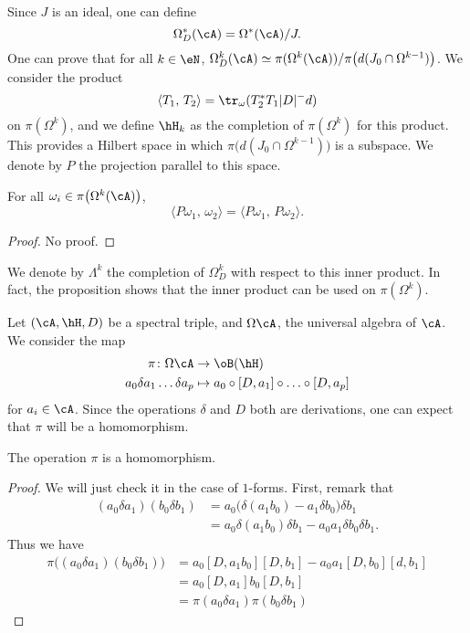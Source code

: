 Since $J$ is an ideal, one can define
\[
	\Omega^*_D(\cA)=\Omega^*(\cA)/J.
\]
One can prove that for all $k\in\eN$, $\Omega^k_D(\cA)\simeq \pi(\Omega^k(\cA))/\pi\big( d(J_0\cap\Omega^{k-1}) \big)$. We consider the product
\begin{equation}
	\langle T_1,\,T_2\rangle=\tr_{\omega}(T_2^*T_1| D |^-d)
\end{equation}
on $\pi(\Omega^k)$, and we define $\hH_k$ as the completion of $\pi(\Omega^k)$ for this product. This provides a Hilbert space in which $\pi\big( d(J_0\cap\Omega^{k-1}) \big)$ is a subspace. We denote by $P$ the projection parallel to this space.

\begin{proposition}
	For all $\omega_i\in\pi\big( \Omega^k(\cA) \big)$,
	\[
		\langle P\omega_1,\,\omega_2\rangle=\langle P\omega_1,\,P\omega_2\rangle.
	\]

\end{proposition}
\begin{proof}
	No proof.
\end{proof}
We denote by $\Lambda^k$ the completion of $\Omega^k_D$ with respect to this inner product. In fact, the proposition shows that the inner product can be used on $\pi(\Omega^k)$.



Let $(\cA,\hH,D)$ be a spectral triple, and $\Omega\cA$, the universal algebra of $\cA$. We consider the map
\begin{equation}	\label{EqDEfpirep}
	\begin{aligned}
		\pi\colon\Omega\cA            & \to \oB(\hH)                                    \\
		a_0\delta a_1\ldots\delta a_p & \mapsto a_0\circ[D,a_1]\circ\ldots\circ [D,a_p]
	\end{aligned}
\end{equation}
for $a_i\in\cA$. Since the operations $\delta$ and $D$ both are derivations, one can expect that $\pi$ will be a homomorphism.

\begin{proposition}
	The operation $\pi$ is a homomorphism.
\end{proposition}
\begin{proof}
	We will just check it in the case of $1$-forms. First, remark that
	\[
		\begin{split}
			(a_0\delta a_1)(b_0\delta b_1)&=a_0\big( \delta(a_1b_0)-a_1\delta b_0 \big)\delta b_1\\
			&=a_0\delta(a_1b_0)\delta b_1-a_0a_1\delta b_0\delta b_1.
		\end{split}
	\]
	Thus we have
	\[
		\begin{split}
			\pi\big( (a_0\delta a_1)(b_0\delta b_1) \big)&=a_0[D,a_1b_0][D,b_1]-a_0a_1[D,b_0][d,b_1]\\
			&=a_0[D,a_1]b_0[D,b_1]\\
			&=\pi(a_0\delta a_1)\pi(b_0\delta b_1)
		\end{split}
	\]

\end{proof}


